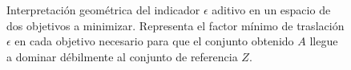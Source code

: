 \begin{figure}[htbp]
{%
}
\caption{Interpretación geométrica del indicador $\epsilon$ aditivo en un espacio de dos objetivos a minimizar. Representa el factor mínimo de traslación $\epsilon$ en cada objetivo necesario para que el conjunto obtenido $A$ llegue a dominar débilmente al conjunto de referencia $Z$.}
\label{fig:indicador_epsilon}
\end{figure}
